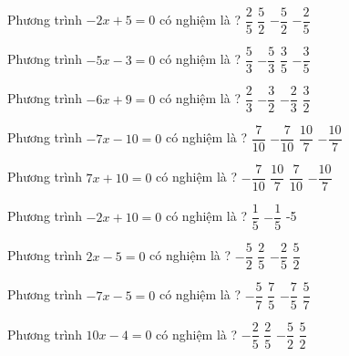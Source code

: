 \begin{ex} 
	Phương trình $-2x+5=0$ có nghiệm là ? 
	\choice
	{$ \dfrac{ 2 }{ 5 } $}
	{\True $ \dfrac{ 5 }{ 2 } $}
	{$- \dfrac{ 5 }{ 2 } $}
	{$- \dfrac{ 2 }{ 5 } $}
	\loigiai{} 
\end{ex}

\begin{ex} 
	Phương trình $-5x-3=0$ có nghiệm là ? 
	\choice
	{$ \dfrac{ 5 }{ 3 } $}
	{$- \dfrac{ 5 }{ 3 } $}
	{$ \dfrac{ 3 }{ 5 } $}
	{\True $- \dfrac{ 3 }{ 5 } $}
	\loigiai{} 
\end{ex}

\begin{ex} 
	Phương trình $-6x+9=0$ có nghiệm là ? 
	\choice
	{$ \dfrac{ 2 }{ 3 } $}
	{$- \dfrac{ 3 }{ 2 } $}
	{$- \dfrac{ 2 }{ 3 } $}
	{\True $ \dfrac{ 3 }{ 2 } $}
	\loigiai{} 
\end{ex}

\begin{ex} 
	Phương trình $-7x-10=0$ có nghiệm là ? 
	\choice
	{$ \dfrac{ 7 }{ 10 } $}
	{$- \dfrac{ 7 }{ 10 } $}
	{$ \dfrac{ 10 }{ 7 } $}
	{\True $- \dfrac{ 10 }{ 7 } $}
	\loigiai{} 
\end{ex}

\begin{ex} 
	Phương trình $7x+10=0$ có nghiệm là ? 
	\choice
	{$- \dfrac{ 7 }{ 10 } $}
	{$ \dfrac{ 10 }{ 7 } $}
	{$ \dfrac{ 7 }{ 10 } $}
	{\True $- \dfrac{ 10 }{ 7 } $}
	\loigiai{} 
\end{ex}

\begin{ex} 
	Phương trình $-2x+10=0$ có nghiệm là ? 
	\choice
	{}
	{$ \dfrac{ 1 }{ 5 } $}
	{$- \dfrac{ 1 }{ 5 } $}
	{-5}
	\loigiai{} 
\end{ex}

\begin{ex} 
	Phương trình $2x-5=0$ có nghiệm là ? 
	\choice
	{$- \dfrac{ 5 }{ 2 } $}
	{$ \dfrac{ 2 }{ 5 } $}
	{$- \dfrac{ 2 }{ 5 } $}
	{\True $ \dfrac{ 5 }{ 2 } $}
	\loigiai{} 
\end{ex}

\begin{ex} 
	Phương trình $-7x-5=0$ có nghiệm là ? 
	\choice
	{\True $- \dfrac{ 5 }{ 7 } $}
	{$ \dfrac{ 7 }{ 5 } $}
	{$- \dfrac{ 7 }{ 5 } $}
	{$ \dfrac{ 5 }{ 7 } $}
	\loigiai{} 
\end{ex}

\begin{ex} 
	Phương trình $10x-4=0$ có nghiệm là ? 
	\choice
	{$- \dfrac{ 2 }{ 5 } $}
	{\True $ \dfrac{ 2 }{ 5 } $}
	{$- \dfrac{ 5 }{ 2 } $}
	{$ \dfrac{ 5 }{ 2 } $}
	\loigiai{} 
\end{ex}

